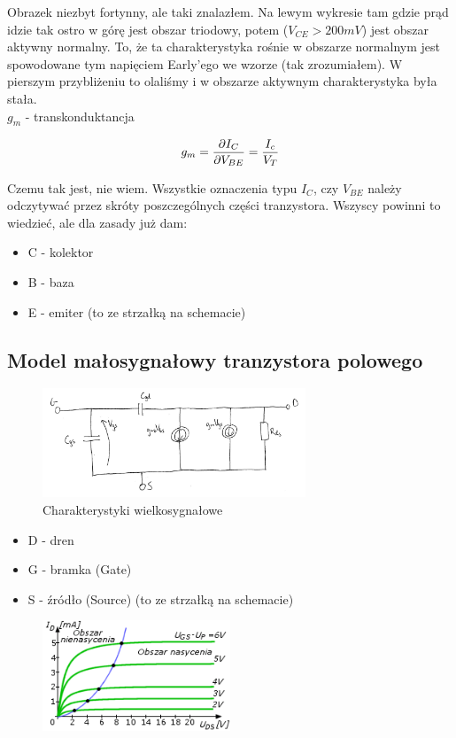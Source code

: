 \documentclass[10pt,a4paper]{article}
\begin{document}
Obrazek niezbyt fortynny, ale taki znalazłem. Na lewym wykresie tam gdzie prąd idzie tak ostro w górę jest obszar triodowy, potem ($V_{CE} > 200mV$) jest obszar aktywny normalny. To, że ta charakterystyka rośnie w obszarze normalnym jest spowodowane tym napięciem Early'ego we wzorze (tak zrozumiałem). W pierszym przybliżeniu to olaliśmy i w obszarze aktywnym charakterystyka była stała.\\


$g_m$ - transkonduktancja

\begin{equation}
g_m = {\partial I_C \over \partial V_{BE}} = {I_c \over V_T}
\end{equation}

Czemu tak jest, nie wiem. Wszystkie oznaczenia typu $I_C$, czy $V_{BE}$ należy odczytywać przez skróty poszczególnych części tranzystora. Wszyscy powinni to wiedzieć, ale dla zasady już dam:
\begin{itemize}
\item C - kolektor
\item B - baza
\item E - emiter (to ze strzałką na schemacie)
\end{itemize}



\subsection{Model małosygnałowy tranzystora polowego}
\begin{figure}[H]
\centering
\includegraphics[width=0.7\textwidth]{malosyg_mos}
\caption{Charakterystyki wielkosygnałowe}
\end{figure}

\begin{itemize}
\item D - dren
\item G - bramka (Gate)
\item S - źródło (Source) (to ze strzałką na schemacie)
\end{itemize}

\begin{figure}[H]
\centering
\includegraphics[width=0.5\textwidth]{charPol}
\end{figure}
\end{document}
